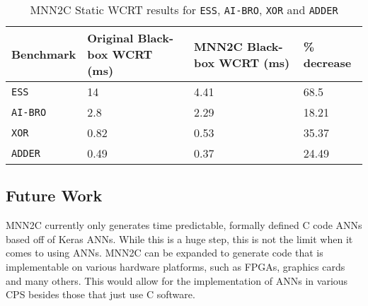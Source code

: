 \begin{table}[H]
	\centering
	\caption{MNN2C Static \ac{WCRT} results for \texttt{ESS}, \texttt{AI-BRO}, \texttt{XOR} and \texttt{ADDER}}
	\label{tbl:res-mnn2c}
	\begin{tabular}{|p{}|p{}|p{}|p{}|}
		\hline
		Benchmark         & Original Black-box WCRT (ms) & MNN2C Black-box WCRT (ms)  &  \% \textbf{decrease} \\ \hline
		\texttt{ESS}        & 14 & 4.41 & 68.5 \\  \hline
		\texttt{AI-BRO}        & 2.8 & 2.29 & 18.21 \\ \hline
		\texttt{XOR}        & 0.82 & 0.53 & 35.37 \\  \hline
		\texttt{ADDER}        & 0.49 & 0.37 & 24.49 \\ \hline
	\end{tabular}
\end{table}

\subsection{Future Work}
\ac{MNN2C} currently only generates time predictable, formally defined C code \acp{ANN} based off of Keras \acp{ANN}.
While this is a huge step, this is not the limit when it comes to using \acp{ANN}.
\ac{MNN2C} can be expanded to generate code that is implementable on various hardware platforms, such as \acp{FPGA}, graphics cards and many others.
This would allow for the implementation of \acp{ANN} in various \ac{CPS} besides those that just use C software.












